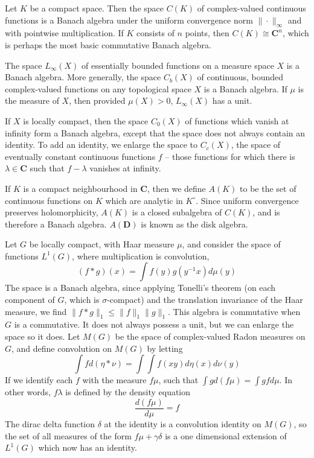 \begin{example}
    Let $K$ be a compact space. Then the space $C(K)$ of complex-valued continuous functions is a Banach algebra under the uniform convergence norm $\| \cdot \|_\infty$ and with pointwise multiplication. If $K$ consists of $n$ points, then $C(K) \cong \mathbf{C}^n$, which is perhaps the most basic commutative Banach algebra.
\end{example}

\begin{example}
    The space $L_\infty(X)$ of essentially bounded functions on a measure space $X$ is a Banach algebra. More generally, the space $C_b(X)$ of continuous, bounded complex-valued functions on any topological space $X$ is a Banach algebra. If $\mu$ is the measure of $X$, then provided $\mu(X) > 0$, $L_\infty(X)$ has a unit.
\end{example}

\begin{example}
    If $X$ is locally compact, then the space $C_0(X)$ of functions which vanish at infinity form a Banach algebra, except that the space does not always contain an identity. To add an identity, we enlarge the space to $C_c(X)$, the space of eventually constant continuous functions $f$ -- those functions for which there is $\lambda \in \mathbf{C}$ such that $f - \lambda$ vanishes at infinity.
\end{example}

\begin{example}
    If $K$ is a compact neighbourhood in $\mathbf{C}$, then we define $A(K)$ to be the set of continuous functions on $K$ which are analytic in $K^\circ$. Since uniform convergence preserves holomorphicity, $A(K)$ is a closed subalgebra of $C(K)$, and is therefore a Banach algebra. $A(\mathbf{D})$ is known as the disk algebra.
\end{example}

\begin{example}
    Let $G$ be locally compact, with Haar measure $\mu$, and consider the space of functions $L^1(G)$, where multiplication is convolution,
    \[ (f * g)(x) = \int f(y) g(y^{-1}x) d\mu(y) \]
    The space is a Banach algebra, since applying Tonelli's theorem (on each component of $G$, which is $\sigma$-compact) and the translation invariance of the Haar measure, we find $\| f * g \|_1 \leq \| f \|_1 \| g \|_1$. This algebra is commutative when $G$ is a commutative. It does not always possess a unit, but we can enlarge the space so it does. Let $M(G)$ be the space of complex-valued Radon measures on $G$, and define convolution on $M(G)$ by letting
    \[ \int f d (\eta * \nu) = \int \int f(xy) d\eta(x) d\nu(y) \]
    If we identify each $f$ with the measure $f \mu$, such that $\int g d(f \mu) = \int g f d\mu$. In other words, $f \lambda$ is defined by the density equation
    \[ \frac{d(f \mu)}{d \mu} = f \]
    The dirac delta function $\delta$ at the identity is a convolution identity on $M(G)$, so the set of all measures of the form $f \mu + \gamma \delta$ is a one dimensional extension of $L^1(G)$ which now has an identity.
\end{example}


